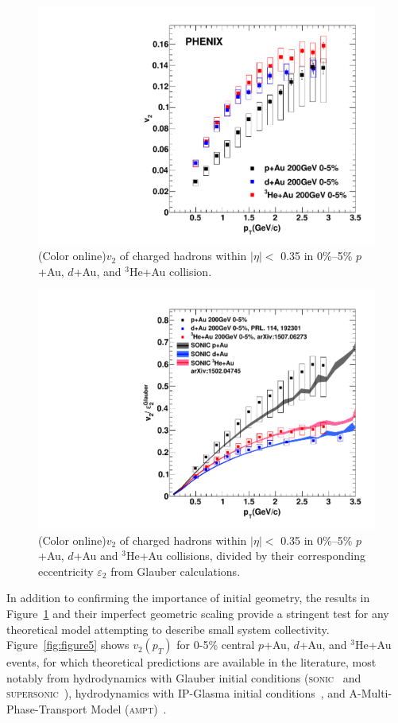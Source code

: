\documentclass[%
reprint,
showpacs,preprintnumbers,
 amsmath,amssymb,
 aps,
]{revtex4-1}
\newcommand{\pt}{\mbox{$p_T$}\xspace}
\newcommand{\dau}{\mbox{$d$+Au}\xspace}
\newcommand{\pau}{\mbox{$p$+Au}\xspace}
\newcommand{\hau}{\mbox{$^3\text{He}$+Au}\xspace}
\begin{document}
\begin{figure}[htbp]
  \includegraphics[scale=0.45]{Figures/figure3.pdf}
  \caption{(Color online)$v_2$ of charged hadrons within $|\eta| <$ 0.35 in 0\%--5\% \pau, \dau, and \hau collision.}
\label{fig:figure3}
\end{figure}

\begin{figure}[htbp]
  \includegraphics[scale=0.45]{Figures/figure4.pdf}
  \caption{(Color online)$v_2$ of charged hadrons within $|\eta| <$ 0.35 in 0\%--5\% \pau, \dau and \hau collisions, divided by their corresponding eccentricity $\varepsilon_2$ from Glauber calculations.}
\label{fig:figure4}
\end{figure}

In addition to confirming the importance of initial geometry, the results in Figure~\ref{fig:figure3} and their imperfect geometric scaling provide a stringent test for any theoretical model attempting to describe small system collectivity. Figure~\ref{fig:figure5} shows $v_2(\pt)$ for 0-5\% central \pau, \dau, and \hau events, for which theoretical predictions are available in the literature, most notably from hydrodynamics with Glauber initial conditions (\textsc{sonic}~\cite{Habich:2014jna} and \textsc{supersonic}~\cite{Romatschke:2015gxa}), hydrodynamics with IP-Glasma initial conditions~\cite{Schenke:2014gaa}, and A-Multi-Phase-Transport Model (\textsc{ampt})~\cite{lin_multiphase_2005}.
\end{document}
